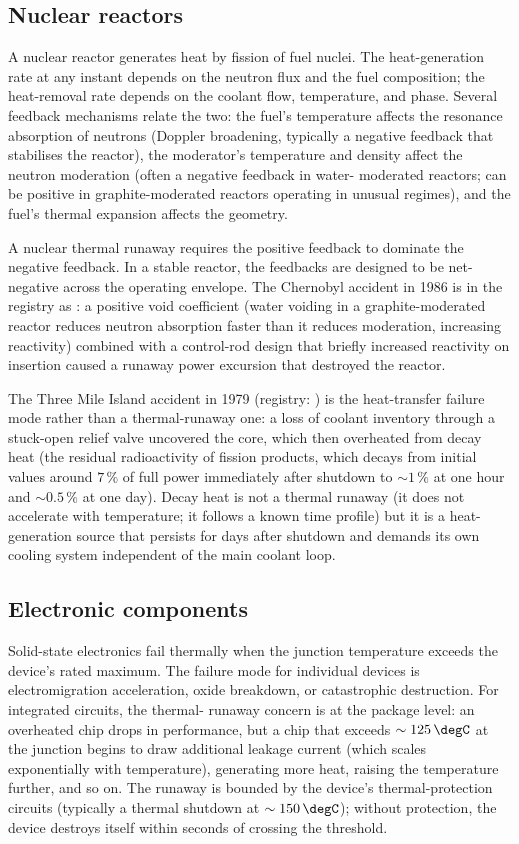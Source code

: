 \subsection{Nuclear reactors}

A nuclear reactor generates heat by fission of fuel nuclei. The
heat-generation rate at any instant depends on the neutron flux and
the fuel composition; the heat-removal rate depends on the coolant
flow, temperature, and phase. Several feedback mechanisms relate
the two: the fuel's temperature affects the resonance absorption of
neutrons (Doppler broadening, typically a negative feedback that
stabilises the reactor), the moderator's temperature and density
affect the neutron moderation (often a negative feedback in water-
moderated reactors; can be positive in graphite-moderated reactors
operating in unusual regimes), and the fuel's thermal expansion
affects the geometry.

A nuclear thermal runaway requires the positive feedback to dominate
the negative feedback. In a stable reactor, the feedbacks are
designed to be net-negative across the operating envelope. The
Chernobyl accident in 1986 is in the registry as
\cite{acc:iaea-insag1-1986, acc:iaea-insag7-1992}: a positive void
coefficient (water voiding in a graphite-moderated reactor reduces
neutron absorption faster than it reduces moderation, increasing
reactivity) combined with a control-rod design that briefly
increased reactivity on insertion caused a runaway power excursion
that destroyed the reactor.

The Three Mile Island accident in 1979 (registry:
\cite{acc:kemeny-tmi-1979}) is the heat-transfer failure mode rather
than a thermal-runaway one: a loss of coolant inventory through a
stuck-open relief valve uncovered the core, which then overheated
from decay heat (the residual radioactivity of fission products,
which decays from initial values around $7\,\%$ of full power immediately
after shutdown to $\sim 1\,\%$ at one hour and $\sim 0.5\,\%$ at one day).
Decay heat is not a thermal runaway (it does not accelerate with
temperature; it follows a known time profile) but it is a heat-
generation source that persists for days after shutdown and demands
its own cooling system independent of the main coolant loop.

\subsection{Electronic components}

Solid-state electronics fail thermally when the junction temperature
exceeds the device's rated maximum. The failure mode for individual
devices is electromigration acceleration, oxide breakdown, or
catastrophic destruction. For integrated circuits, the thermal-
runaway concern is at the package level: an overheated chip drops
in performance, but a chip that exceeds $\sim 125\,\degC$ at the
junction begins to draw additional leakage current (which scales
exponentially with temperature), generating more heat, raising the
temperature further, and so on. The runaway is bounded by the
device's thermal-protection circuits (typically a thermal shutdown
at $\sim 150\,\degC$); without protection, the device destroys
itself within seconds of crossing the threshold.


